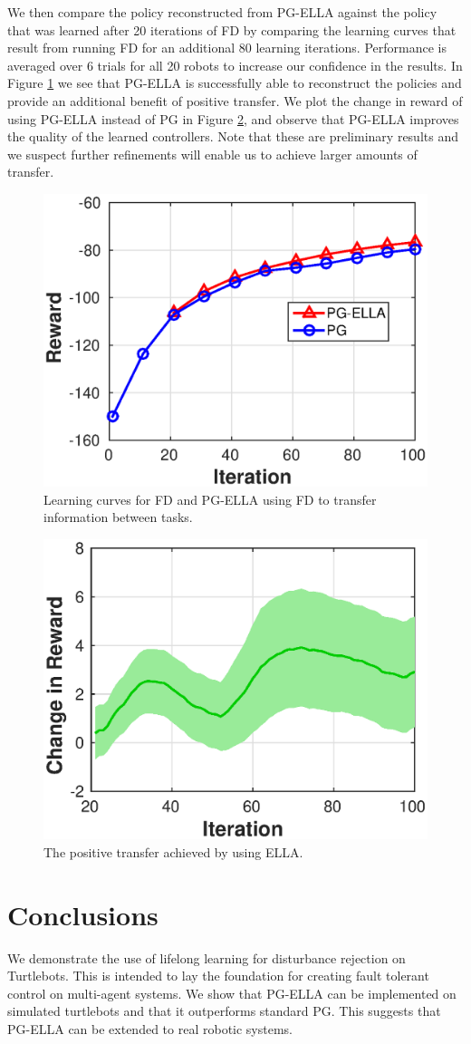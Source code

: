 \documentclass{aamas2016}
\begin{document}
We then compare the policy reconstructed from PG-ELLA against the policy that was learned after 20 iterations of FD by comparing the learning curves that result from running FD for an additional 80 learning iterations. Performance is averaged over 6 trials for all 20 robots to increase our confidence in the results. In Figure \ref{fig:reward} we see that PG-ELLA is successfully able to reconstruct the policies and provide an additional benefit of positive transfer. We plot the change in reward of using PG-ELLA instead of PG in Figure \ref{fig:gain}, and observe that PG-ELLA improves the quality of the learned controllers. Note that these are preliminary results and we suspect further refinements will enable us to achieve larger amounts of transfer.

\begin{figure}[!htbp]
    \centering
        \includegraphics[width=.42\textwidth]{images/2016_02_06_learning.eps}
        \caption{Learning curves for FD and PG-ELLA using FD to transfer information between tasks. }\label{fig:reward}
\end{figure}

\begin{figure}[!htbp]
    \centering
        \includegraphics[width=.42\textwidth]{images/2016_02_06_gain.eps}
        \caption{The positive transfer achieved by using ELLA. }\label{fig:gain}
\end{figure}

\section{Conclusions}
We demonstrate the use of lifelong learning for disturbance rejection on Turtlebots. This is intended to lay the foundation for creating fault tolerant control on multi-agent systems. We show that PG-ELLA can be implemented on simulated turtlebots and that it outperforms standard PG. This suggests that PG-ELLA can be extended to real robotic systems.
\end{document}
